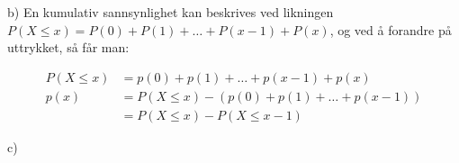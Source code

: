 \documentclass[12pt, a4paper]{article}
\begin{document}
b) En kumulativ sannsynlighet kan beskrives ved likningen $P(X \leq x) = P(0) + P(1) + \dots + P(x-1) + P(x)$, og ved å forandre på uttrykket, så får man:

\begin{equation}
    \begin{split}
        P(X \leq x) &= p(0) + p(1) + \dots + p(x-1) + p(x) \\
               p(x) &= P(X \leq x) - (p(0) + p(1) + \dots + p(x-1)) \\
                    &= P(X \leq x) - P(X \leq x - 1)
    \end{split}
\end{equation}

c)


\end{document}
